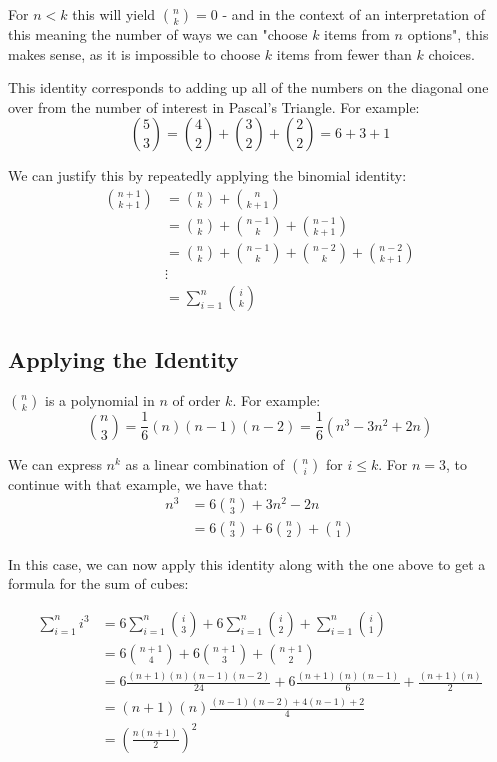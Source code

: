 \documentclass{article}
\begin{document}
For $n<k$ this will yield $\binom{n}{k} = 0$ - and in the context of an interpretation of
this meaning the number of ways we can "choose $k$ items from $n$ options", this makes sense, as it is impossible to choose $k$ items from fewer than $k$ choices.

This identity corresponds to adding up all of the numbers on the diagonal one over from the
number of interest in Pascal's Triangle. For example:
\[ \binom{5}{3} = \binom{4}{2} + \binom{3}{2} + \binom{2}{2} = 6 + 3 + 1 \]

We can justify this by repeatedly applying the binomial identity:
\begin{align*}
	\binom{n+1}{k+1} &= \binom{n}{k} + \binom{n}{k+1} \\
	&= \binom{n}{k} + \binom{n-1}{k} + \binom{n-1}{k+1} \\
	&= \binom{n}{k} + \binom{n-1}{k} + \binom{n-2}{k} + \binom{n-2}{k+1} \\
	&\vdots \\
	&= \sum_{i=1}^{n} \binom{i}{k} 
\end{align*}

\subsection{Applying the Identity}

$\binom{n}{k}$ is a polynomial in $n$ of order $k$. For example:
\[ \binom{n}{3} = \frac{1}{6}(n)(n-1)(n-2) = \frac{1}{6}(n^3-3n^2+2n) \]

We can express $n^k$ as a linear combination of $\binom{n}{i}$ for $i\leq k$. For $n=3$,
to continue with that example, we have that:
\begin{align*}
	n^3 &= 6\binom{n}{3} +3n^2-2n \\
	&= 6\binom{n}{3} + 6 \binom{n}{2} +\binom{n}{1}
\end{align*}

In this case, we can now apply this identity along with the one above to get a formula
for the sum of cubes:

\begin{align*}
	\sum_{i=1}^{n} i^3 &= 6\sum_{i=1}^{n} \binom{i}{3} + 6\sum_{i=1}^{n} \binom{i}{2}
	+ \sum_{i=1}^{n} \binom{i}{1} \\
	&= 6\binom{n+1}{4} +6\binom{n+1}{3} + \binom{n+1}{2} \\
	&= 6\frac{(n+1)(n)(n-1)(n-2)}{24} +6 \frac{(n+1)(n)(n-1)}{6} + \frac{(n+1)(n)}{2} \\
	&= (n+1)(n) \frac{(n-1)(n-2) + 4(n-1) + 2}{4} \\
	&= \left(\frac{n(n+1)}{2}\right)^2
\end{align*}
\end{document}
